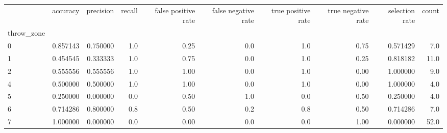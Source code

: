 \begin{tabular}{lrrrrrrrrr}
\toprule
{} &  accuracy &  precision &  recall &  false positive rate &  false negative rate &  true positive rate &  true negative rate &  selection rate &  count \\
throw\_zone &           &            &         &                      &                      &                     &                     &                 &        \\
\midrule
0          &  0.857143 &   0.750000 &     1.0 &                 0.25 &                  0.0 &                 1.0 &                0.75 &        0.571429 &    7.0 \\
1          &  0.454545 &   0.333333 &     1.0 &                 0.75 &                  0.0 &                 1.0 &                0.25 &        0.818182 &   11.0 \\
2          &  0.555556 &   0.555556 &     1.0 &                 1.00 &                  0.0 &                 1.0 &                0.00 &        1.000000 &    9.0 \\
4          &  0.500000 &   0.500000 &     1.0 &                 1.00 &                  0.0 &                 1.0 &                0.00 &        1.000000 &    4.0 \\
5          &  0.250000 &   0.000000 &     0.0 &                 0.50 &                  1.0 &                 0.0 &                0.50 &        0.250000 &    4.0 \\
6          &  0.714286 &   0.800000 &     0.8 &                 0.50 &                  0.2 &                 0.8 &                0.50 &        0.714286 &    7.0 \\
7          &  1.000000 &   0.000000 &     0.0 &                 0.00 &                  0.0 &                 0.0 &                1.00 &        0.000000 &   52.0 \\
\bottomrule
\end{tabular}
